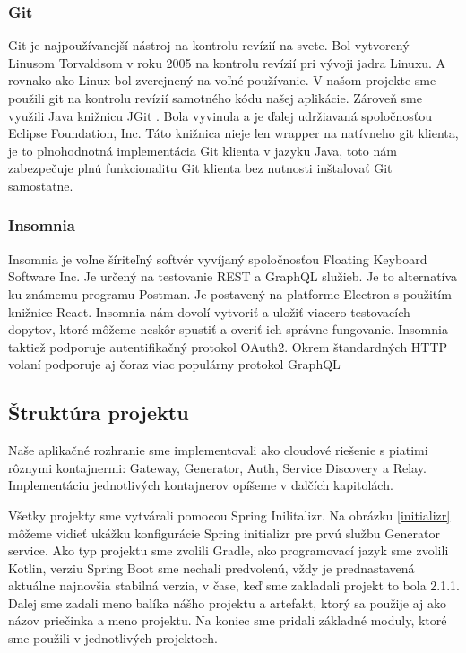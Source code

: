 \subsubsection{Git}
Git je najpoužívanejší nástroj na kontrolu revízií na svete. Bol vytvorený Linusom Torvaldsom v roku 2005 na kontrolu revízií pri vývoji jadra Linuxu. A rovnako ako Linux bol zverejnený na voľné používanie. V našom projekte sme použili git na kontrolu revízií samotného kódu našej aplikácie. Zároveň sme využili Java knižnicu JGit \cite{jgit}. Bola vyvinula a je ďalej udržiavaná spoločnosťou Eclipse Foundation, Inc. Táto knižnica nieje len wrapper na natívneho git klienta, je to plnohodnotná implementácia Git klienta v jazyku Java, toto nám zabezpečuje plnú funkcionalitu Git klienta bez nutnosti inštalovať Git samostatne. 

\subsubsection{Insomnia}
Insomnia \cite{insomnia} je voľne šíriteľný softvér vyvíjaný spoločnosťou Floating Keyboard Software Inc. Je určený na testovanie REST a GraphQL služieb. Je to alternatíva ku známemu programu Postman. Je postavený na platforme Electron s použitím knižnice React. Insomnia nám dovolí vytvoriť a uložiť viacero testovacích dopytov, ktoré môžeme neskôr spustiť a overiť ich správne fungovanie. Insomnia taktiež podporuje autentifikačný protokol OAuth2. Okrem štandardných HTTP volaní podporuje aj čoraz viac populárny protokol GraphQL



\subsection{Štruktúra projektu}
Naše aplikačné rozhranie sme implementovali ako cloudové riešenie s piatimi rôznymi kontajnermi: Gateway, Generator, Auth, Service Discovery a Relay. Implementáciu jednotlivých kontajnerov opíšeme v ďalčích kapitolách.

Všetky projekty sme vytvárali pomocou Spring Inilitalizr. Na obrázku \ref{initializr} môžeme vidieť ukážku konfigurácie Spring initializr pre prvú službu Generator service.  Ako typ projektu sme zvolili Gradle, ako programovací jazyk sme zvolili Kotlin, verziu Spring Boot sme nechali predvolenú, vždy je prednastavená aktuálne najnovšia stabilná verzia, v čase, keď sme zakladali projekt to bola 2.1.1. Dalej sme zadali meno balíka nášho projektu a artefakt, ktorý sa použije aj ako názov priečinka a meno projektu. Na koniec sme pridali základné moduly, ktoré sme použili v jednotlivých projektoch.


